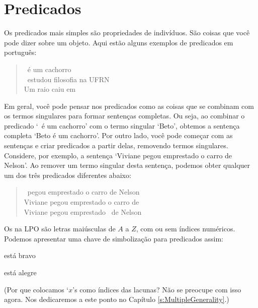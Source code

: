 \section{Predicados}
Os predicados mais simples são propriedades de indivíduos.
São coisas que você pode dizer sobre um objeto.
Aqui estão alguns exemplos de predicados em português:
	\begin{quote}
		\blank\ é um cachorro\\
		\blank\ estudou filosofia na UFRN\\
		Um raio caiu em \blank
	\end{quote}
Em geral, você pode pensar nos predicados como as coisas que se combinam com os termos singulares para formar sentenças completas.
Ou seja, ao combinar o predicado `\blank\ é um cachorro' com o termo singular `Beto', obtemos a sentença completa `Beto é um cachorro'.
Por outro lado, você pode começar com as sentenças e criar predicados a partir delas, removendo termos singulares.
Considere, por exemplo, a sentença `Viviane pegou emprestado o carro de Nelson'.
Ao remover um termo singular desta sentença, podemos obter qualquer um dos três predicados diferentes abaixo:
	\begin{quote}
		\blank\ pegou emprestado o carro de Nelson\\
			Viviane pegou emprestado o carro de \blank\\
		Viviane pegou emprestado \blank\ de Nelson
	\end{quote}
Os  na LPO são letras maiúsculas de $A$ a $Z$, com ou sem índices numéricos.
Podemos apresentar uma chave de simbolização para predicados assim:
	\begin{ekey}
		\item[\atom{B}{x}]  está bravo
		\item[\atom{A}{x}]  está alegre
	\end{ekey}
       (Por que colocamos `$x$'s como índices das lacunas? Não se preocupe com isso agora.
       Nos dedicaremos a este ponto no Capítulo \ref{s:MultipleGenerality}.)

